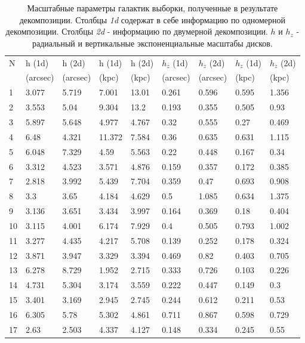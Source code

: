 \begin{longtable}{|l|l|l|l|l|l|l|l|l|}
\caption{Масштабные параметры галактик выборки, полученные в результате декомпозиции. Столбцы \textit{1d} содержат в себе информацию по одномерной декомпозиции. Столбцы \textit{2d} - информацию по двумерной декомпозиции. $h$ и $h_z$ - радиальный и вертикальные экспоненциальные масштабы дисков.} \label{tab:tab3}  \\ \hline
 N & h (1d) & h (2d)  & h (1d) & h (2d)& $h_z$ (1d) & $h_z$ (2d)  & $h_z$ (1d) & $h_z$ (2d) \\ 
  & (arcsec) & (arcsec) & (kpc) & (kpc) & (arcsec) & (arcsec) & (kpc) & (kpc) \\ \hline\hline
        1 & 3.077 & 5.719 & 7.001 & 13.01 & 0.261 & 0.596 & 0.595 & 1.356 \\ 
        2 & 3.553 & 5.04 & 9.304 & 13.2 & 0.193 & 0.355 & 0.505 & 0.93 \\ 
        3 & 5.897 & 5.648 & 4.977 & 4.767 & 0.32 & 0.555 & 0.27 & 0.469 \\ 
        4 & 6.48 & 4.321 & 11.372 & 7.584 & 0.36 & 0.635 & 0.631 & 1.115 \\ 
        5 & 6.048 & 7.329 & 4.59 & 5.563 & 0.22 & 0.448 & 0.167 & 0.34 \\ 
        6 & 3.312 & 4.523 & 3.571 & 4.876 & 0.159 & 0.357 & 0.172 & 0.385 \\ 
        7 & 2.818 & 3.992 & 5.439 & 7.704 & 0.359 & 0.47 & 0.693 & 0.908 \\ 
        8 & 3.3 & 3.65 & 4.184 & 4.629 & 0.5 & 1.085 & 0.634 & 1.375 \\ 
        9 & 3.136 & 3.651 & 3.434 & 3.997 & 0.164 & 0.369 & 0.18 & 0.404 \\ 
        10 & 3.115 & 4.001 & 6.174 & 7.929 & 0.4 & 0.505 & 0.793 & 1.002 \\ 
        11 & 3.277 & 4.435 & 4.217 & 5.708 & 0.139 & 0.252 & 0.178 & 0.324 \\ 
        12 & 3.871 & 3.947 & 3.329 & 3.394 & 0.469 & 0.82 & 0.403 & 0.705 \\ 
        13 & 6.278 & 8.729 & 1.952 & 2.715 & 0.333 & 0.726 & 0.103 & 0.226 \\ 
        14 & 4.731 & 5.304 & 3.174 & 3.559 & 0.222 & 0.447 & 0.149 & 0.3 \\ 
        15 & 3.401 & 3.169 & 2.945 & 2.745 & 0.244 & 0.612 & 0.211 & 0.53 \\ 
        16 & 6.305 & 5.78 & 5.302 & 4.861 & 0.711 & 0.867 & 0.598 & 0.729 \\ 
        17 & 2.63 & 2.503 & 4.337 & 4.127 & 0.148 & 0.334 & 0.245 & 0.55 \\ 

\end{longtable}
